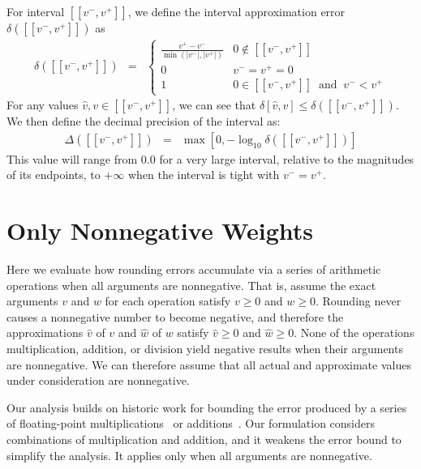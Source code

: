 \documentclass[
hf
]{ceurart}
\newcommand{\approximate}[1]{\hat{#1}}
\newcommand{\approxv}{\approximate{v}}
\newcommand{\approxw}{\approximate{w}}
\newcommand{\aerror}{\delta}
\newcommand{\digitprecision}{\Delta}
\newcommand{\vmin}{v^{-}}
\newcommand{\vmax}{v^{+}}
\newcommand{\interval}[1]{[\![#1]\!]}
\begin{document}
For interval $\interval{\vmin, \vmax}$, we define the interval approximation error $\aerror(\interval{\vmin, \vmax})$ as
\begin{eqnarray}
\aerror(\interval{\vmin, \vmax}) & = & \left\{ \begin{array}{ll}
  \frac{\vmax - \vmin}{\min(|\vmin|, |\vmax|)}  & 0 \not \in \interval{\vmin, \vmax}\\[0.8em]
  0 & \vmin = \vmax = 0 \\
  1 & 0 \in \interval{\vmin, \vmax} \;\; \textrm{and} \;\; \vmin < \vmax
  \end{array} \right. \label{eqn:interval:error}
\end{eqnarray}
For any values $\approxv, v \in \interval{\vmin, \vmax}$, we can see that
$\aerror[\approxv, v] \leq \aerror(\interval{\vmin, \vmax})$.
We then define the decimal precision of the interval as:
\begin{eqnarray}
\digitprecision(\interval{\vmin, \vmax}) & = & \max[0, -\log_{10} \aerror(\interval{\vmin, \vmax})] \label{eqn:interval:digitprecision} 
\end{eqnarray}
This value will range from $0.0$ for a very large interval, relative to the magnitudes of its endpoints, to $+\infty$ when the interval is tight with $\vmin = \vmax$.

\section{Only Nonnegative Weights}
\label{sect:nonneg}

Here we evaluate how rounding errors accumulate via a series of
arithmetic operations when all arguments are nonnegative.
That is, assume the exact arguments $v$ and $w$ for each operation satisfy $v \geq 0$ and $w \geq 0$.
Rounding never causes a nonnegative number to become negative, and therefore 
the approximations $\approxv$ of  $v$ and $\approxw$ of $w$ satisfy $\approxv \geq 0$ and $\approxw \geq 0$.
None of the operations multiplication, addition, or division yield negative results when their arguments are nonnegative.
We can therefore
assume that all actual and approximate values under consideration are
nonnegative.

Our analysis builds on historic work for bounding the error produced
by a series of floating-point
multiplications~\cite{muller:hfpa:2018,rump:bit:2015,wilkinson:nm:1960,wilkinson:rounding:1964} or
additions~\cite{higham:siam:1993}.  Our formulation considers combinations of multiplication and addition, and it weakens the error bound to simplify the analysis.
It
applies only when all arguments are nonnegative.
\end{document}
